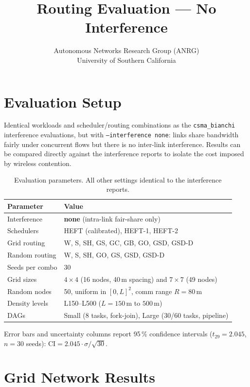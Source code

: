 \documentclass[11pt]{article}
\title{Routing Evaluation --- No Interference}
\author{Autonomous Networks Research Group (ANRG)\\University of Southern California}
\date{}
\begin{document}
\maketitle
\tableofcontents
\newpage

\section{Evaluation Setup}

Identical workloads and scheduler/routing combinations as the \texttt{csma\_bianchi}
interference evaluations, but with \texttt{--interference none}: links share
bandwidth fairly under concurrent flows but there is no inter-link interference.
Results can be compared directly against the interference reports to isolate
the cost imposed by wireless contention.

\begin{table}[H]\centering
\begin{tabular}{ll}\toprule
\textbf{Parameter} & \textbf{Value} \\\midrule
Interference & \textbf{none} (intra-link fair-share only) \\
Schedulers & HEFT (calibrated), HEFT-1, HEFT-2 \\
Grid routing & W, S, SH, GS, GC, GB, GO, GSD, GSD-D \\
Random routing & W, S, SH, GO, GS, GSD, GSD-D \\
Seeds per combo & 30 \\
Grid sizes & $4\times4$ (16 nodes, 40\,m spacing) and $7\times7$ (49 nodes) \\
Random nodes & 50, uniform in $[0,L]^2$, comm range $R=80$\,m \\
Density levels & L150--L500 ($L=150$\,m to $500$\,m) \\
DAGs & Small (8 tasks, fork-join), Large (30/60 tasks, pipeline) \\
\bottomrule\end{tabular}
\caption{Evaluation parameters. All other settings identical to the interference reports.}
\end{table}

Error bars and uncertainty columns report 95\,\% confidence intervals
($t_{29}=2.045$, $n=30$ seeds): $\mathrm{CI} = 2.045 \cdot \sigma / \sqrt{30}$.

\section{Grid Network Results}
\end{document}
